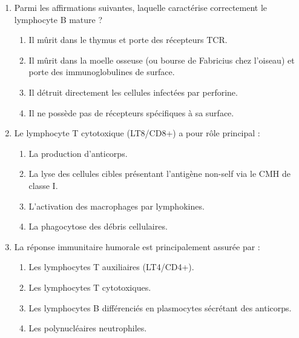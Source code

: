 \documentclass[11pt]{article}
\begin{document}
\begin{exercice}
\begin{enumerate}
    \item Parmi les affirmations suivantes, laquelle caractérise correctement le lymphocyte B mature ?
    \begin{enumerate}
        \item Il mûrit dans le thymus et porte des récepteurs TCR.
        \item Il mûrit dans la moelle osseuse (ou bourse de Fabricius chez l'oiseau) et porte des immunoglobulines de surface.
        \item Il détruit directement les cellules infectées par perforine.
        \item Il ne possède pas de récepteurs spécifiques à sa surface.
    \end{enumerate}
    \item Le lymphocyte T cytotoxique (LT8/CD8+) a pour rôle principal :
    \begin{enumerate}
        \item La production d'anticorps.
        \item La lyse des cellules cibles présentant l'antigène non-self via le CMH de classe I.
        \item L'activation des macrophages par lymphokines.
        \item La phagocytose des débris cellulaires.
    \end{enumerate}
    \item La réponse immunitaire humorale est principalement assurée par :
    \begin{enumerate}
        \item Les lymphocytes T auxiliaires (LT4/CD4+).
        \item Les lymphocytes T cytotoxiques.
        \item Les lymphocytes B différenciés en plasmocytes sécrétant des anticorps.
        \item Les polynucléaires neutrophiles.
    \end{enumerate}
\end{enumerate}
\end{exercice}
\end{document}
